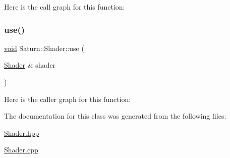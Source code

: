 Here is the call graph for this function\+:
\mbox{\label{class_saturn_1_1_shader_a9102b4acb66e5338f75de94acd883570}} 
\subsubsection{\texorpdfstring{use()}{use()}}
{\footnotesize\ttfamily \mbox{\hyperlink{glad_8h_a950fc91edb4504f62f1c577bf4727c29}{void}} Saturn\+::\+Shader\+::use (\begin{DoxyParamCaption}\item[{\mbox{\hyperlink{class_saturn_1_1_shader}{Shader}} \&}]{shader }\end{DoxyParamCaption})\hspace{0.3cm}{\ttfamily [static]}}

Here is the caller graph for this function\+:


The documentation for this class was generated from the following files\+:\begin{DoxyCompactItemize}
\item 
\mbox{\hyperlink{_shader_8hpp}{Shader.\+hpp}}\item 
\mbox{\hyperlink{_shader_8cpp}{Shader.\+cpp}}\end{DoxyCompactItemize}
